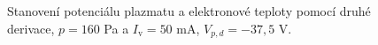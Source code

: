 \documentclass[a4paper,12pt]{article}
\begin{document}
\newpage
\begin{figure}[h]
	\centering
	\begin{subfigure}[b]{.49\textwidth}
		\centering
	\end{subfigure}
	\begin{subfigure}[b]{.49\textwidth}
		\centering
	\end{subfigure}
	\caption{Stanovení potenciálu plazmatu a elektronové teploty pomocí druhé 
	derivace, $p = 160$ 
	\si{\pascal} a $I_\text{v} = 50$ \si{\milli\ampere}, $V_{p,d} = 
	-37,5$ V.}
	\label{data2sec}
\end{figure}
\end{document}
